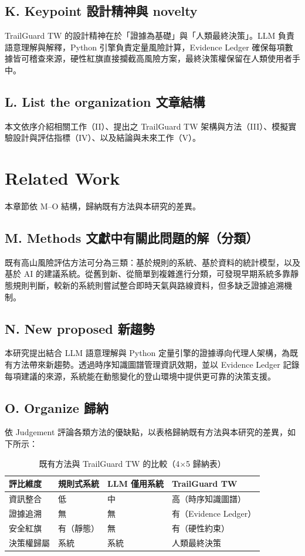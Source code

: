 \documentclass[12pt,a4paper]{article}
\begin{document}
\subsection*{K. Keypoint 設計精神與 novelty}
TrailGuard TW 的設計精神在於「證據為基礎」與「人類最終決策」。LLM 負責語意理解與解釋，Python 引擎負責定量風險計算，Evidence Ledger 確保每項數據皆可稽查來源，硬性紅旗直接攔截高風險方案，最終決策權保留在人類使用者手中。

\subsection*{L. List the organization 文章結構}
本文依序介紹相關工作（II）、提出之 TrailGuard TW 架構與方法（III）、模擬實驗設計與評估指標（IV）、以及結論與未來工作（V）。

\section{Related Work}
本章節依 M–O 結構，歸納既有方法與本研究的差異。

\subsection*{M. Methods 文獻中有關此問題的解（分類）}
既有高山風險評估方法可分為三類：基於規則的系統、基於資料的統計模型，以及基於 AI 的建議系統。從舊到新、從簡單到複雜進行分類，可發現早期系統多靠靜態規則判斷，較新的系統則嘗試整合即時天氣與路線資料，但多缺乏證據追溯機制。

\subsection*{N. New proposed 新趨勢}
本研究提出結合 LLM 語意理解與 Python 定量引擎的證據導向代理人架構，為既有方法帶來新趨勢。透過時序知識圖譜管理資訊效期，並以 Evidence Ledger 記錄每項建議的來源，系統能在動態變化的登山環境中提供更可靠的決策支援。

\subsection*{O. Organize 歸納}
依 Judgement 評論各類方法的優缺點，以表格歸納既有方法與本研究的差異，如下所示：

\begin{table}[htbp]
\centering
\caption{既有方法與 TrailGuard TW 的比較（4$\times$5 歸納表）}
\label{tab:comparison}
\begin{tabular}{l|p{3cm}|p{3cm}|p{3cm}}
\toprule
評比維度 & 規則式系統 & LLM 僅用系統 & TrailGuard TW \\
\midrule
資訊整合 & 低 & 中 & 高（時序知識圖譜） \\
證據追溯 & 無 & 無 & 有（Evidence Ledger） \\
安全紅旗 & 有（靜態） & 無 & 有（硬性約束） \\
決策權歸屬 & 系統 & 系統 & 人類最終決策 \\
\bottomrule
\end{tabular}
\end{table}
\end{document}
